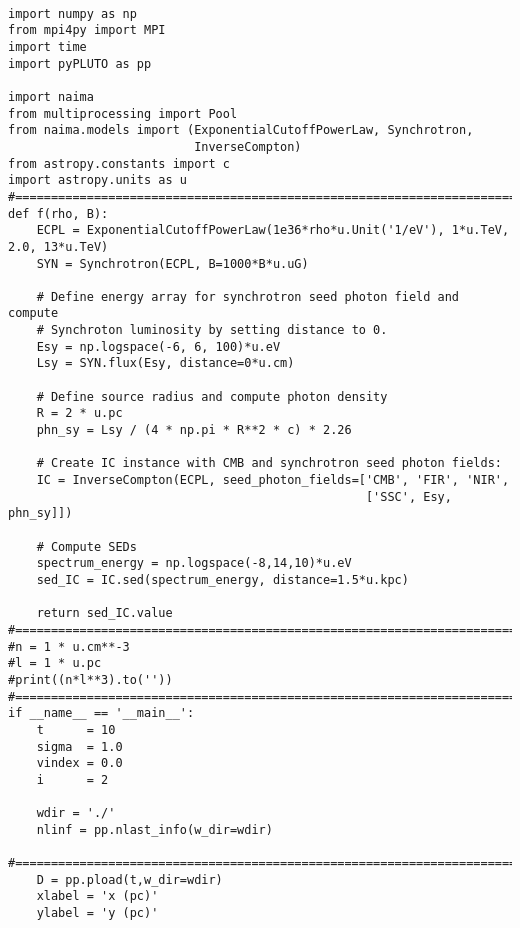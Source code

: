 \begin{lstlisting}

import numpy as np
from mpi4py import MPI
import time
import pyPLUTO as pp

import naima
from multiprocessing import Pool
from naima.models import (ExponentialCutoffPowerLaw, Synchrotron,
                          InverseCompton)
from astropy.constants import c
import astropy.units as u
#==============================================================================
def f(rho, B):
    ECPL = ExponentialCutoffPowerLaw(1e36*rho*u.Unit('1/eV'), 1*u.TeV, 2.0, 13*u.TeV)
    SYN = Synchrotron(ECPL, B=1000*B*u.uG)

    # Define energy array for synchrotron seed photon field and compute
    # Synchroton luminosity by setting distance to 0.
    Esy = np.logspace(-6, 6, 100)*u.eV
    Lsy = SYN.flux(Esy, distance=0*u.cm)

    # Define source radius and compute photon density
    R = 2 * u.pc
    phn_sy = Lsy / (4 * np.pi * R**2 * c) * 2.26

    # Create IC instance with CMB and synchrotron seed photon fields:
    IC = InverseCompton(ECPL, seed_photon_fields=['CMB', 'FIR', 'NIR',
                                                  ['SSC', Esy, phn_sy]])

    # Compute SEDs
    spectrum_energy = np.logspace(-8,14,10)*u.eV
    sed_IC = IC.sed(spectrum_energy, distance=1.5*u.kpc)

    return sed_IC.value
#==============================================================================
#n = 1 * u.cm**-3
#l = 1 * u.pc
#print((n*l**3).to(''))
#==============================================================================
if __name__ == '__main__':
    t      = 10
    sigma  = 1.0
    vindex = 0.0
    i      = 2

    wdir = './'
    nlinf = pp.nlast_info(w_dir=wdir)

#==============================================================================
    D = pp.pload(t,w_dir=wdir)
    xlabel = 'x (pc)'
    ylabel = 'y (pc)'

\end{lstlisting}
